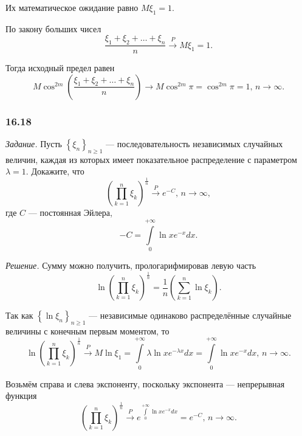 \begin{enumerate}[label=\alph*)]
Их математическое ожидание равно $M \xi_1 = 1$.

По закону больших чисел
$$ \frac{ \xi_1 + \xi_2 + \dotsc + \xi_n}{n} \overset{P}{ \rightarrow } M \xi_1 = 1.$$

Тогда исходный предел равен
$$M \cos^{2m} \left( \frac{ \xi_1 + \xi_2 + \dotsc + \xi_n}{n} \right) \to M \cos^{2m} \pi =
\cos^{2m} \pi = 1, \,
n \to \infty.$$
\end{enumerate}

\subsubsection*{16.18}

\textit{Задание.}
Пусть $ \left\{ \xi_n \right\}_{n \geq 1}$ --- последовательность независимых случайных величин,
каждая из которых имеет показательное распределение с параметром $ \lambda = 1$.
Докажите, что
$$ \left( \prod \limits_{k = 1}^n \xi_k \right)^{ \frac{1}{n}} \overset{P}{ \rightarrow } e^{-C}, \,
  n \to \infty,$$
где $C$ --- постоянная Эйлера,
$$-C =
  \int \limits_0^{+ \infty } \ln x e^{-x} dx.$$

\textit{Решение.} Сумму можно получить, прологарифмировав левую часть
$$ \ln \left( \prod \limits_{k = 1}^n \xi_k \right)^{ \frac{1}{n}} =
  \frac{1}{n} \left( \sum \limits_{k = 1}^n \ln \xi_k \right).$$

Так как $ \left\{ \ln \xi_n \right\}_{n \geq 1}$ ---
независимые одинаково распределённые случайные величины с конечным первым моментом, то
$$ \ln \left( \prod \limits_{k = 1}^n \xi_k \right)^{ \frac{1}{n}} \overset{P}{ \rightarrow }
  M \ln \xi_1 =
  \int \limits_0^{+ \infty } \lambda \ln x e^{- \lambda x} dx =
  \int \limits_0^{+ \infty } \ln x e^{- x} dx, \,
  n \to \infty.$$

Возьмём справа и слева экспоненту, поскольку экспонента --- непрерывная функция
$$ \left( \prod \limits_{k = 1}^n \xi_k \right)^{ \frac{1}{n}} \overset{P}{ \rightarrow }
  e^{ \int \limits_0^{+ \infty } \ln x e^{-x} dx} =
  e^{-C}, \,
  n \to \infty.$$

